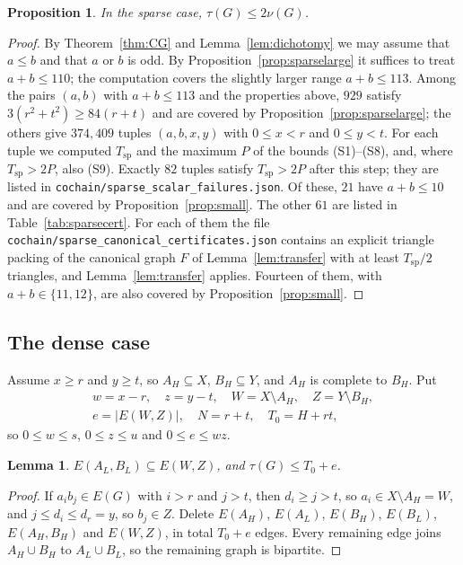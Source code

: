 \documentclass{amsart}
\newtheorem{lemma}[theorem]{Lemma}
\newtheorem{proposition}[theorem]{Proposition}
\theoremstyle{definition}
\theoremstyle{remark}
\numberwithin{equation}{section}
\numberwithin{table}{section}
\begin{document}
\begin{proposition}\label{prop:sparsefinite}
In the sparse case, $\tau(G)\le2\nu(G)$.
\end{proposition}

\begin{proof}
By Theorem~\ref{thm:CG} and Lemma~\ref{lem:dichotomy} we may assume that $a\le b$ and that $a$ or $b$ is odd. By Proposition~\ref{prop:sparselarge} it suffices to treat $a+b\le110$; the computation covers the slightly larger range $a+b\le113$. Among the pairs $(a,b)$ with $a+b\le113$ and the properties above, $929$ satisfy $3(r^2+t^2)\ge84(r+t)$ and are covered by Proposition~\ref{prop:sparselarge}; the others give $374{,}409$ tuples $(a,b,x,y)$ with $0\le x<r$ and $0\le y<t$. For each tuple we computed $T_{\mathrm{sp}}$ and the maximum $P$ of the bounds (S1)--(S8), and, where $T_{\mathrm{sp}}>2P$, also (S9). Exactly $82$ tuples satisfy $T_{\mathrm{sp}}>2P$ after this step; they are listed in \texttt{cochain/sparse\_scalar\_failures.json}. Of these, $21$ have $a+b\le10$ and are covered by Proposition~\ref{prop:small}. The other $61$ are listed in Table~\ref{tab:sparsecert}. For each of them the file \texttt{cochain/sparse\_canonical\_certificates.json} contains an explicit triangle packing of the canonical graph $F$ of Lemma~\ref{lem:transfer} with at least $T_{\mathrm{sp}}/2$ triangles, and Lemma~\ref{lem:transfer} applies. Fourteen of them, with $a+b\in\{11,12\}$, are also covered by Proposition~\ref{prop:small}.
\end{proof}

\subsection{The dense case}\label{ssec:dense}
Assume $x\ge r$ and $y\ge t$, so $A_H\subseteq X$, $B_H\subseteq Y$, and $A_H$ is complete to $B_H$. Put
\begin{gather*}
w=x-r,\quad z=y-t,\quad W=X\setminus A_H,\quad Z=Y\setminus B_H,\\
e=|E(W,Z)|,\quad N=r+t,\quad T_0=H+rt,
\end{gather*}
so $0\le w\le s$, $0\le z\le u$ and $0\le e\le wz$.

\begin{lemma}\label{lem:densecover}
$E(A_L,B_L)\subseteq E(W,Z)$, and $\tau(G)\le T_0+e$.
\end{lemma}

\begin{proof}
If $a_ib_j\in E(G)$ with $i>r$ and $j>t$, then $d_i\ge j>t$, so $a_i\in X\setminus A_H=W$, and $j\le d_i\le d_r=y$, so $b_j\in Z$. Delete $E(A_H)$, $E(A_L)$, $E(B_H)$, $E(B_L)$, $E(A_H,B_H)$ and $E(W,Z)$, in total $T_0+e$ edges. Every remaining edge joins $A_H\cup B_H$ to $A_L\cup B_L$, so the remaining graph is bipartite.
\end{proof}
\end{document}
